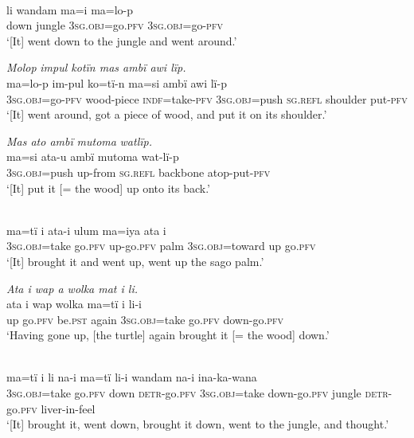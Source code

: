 \\
\gll li    wandam  ma{=i} ma=lo-p\\
down  jungle    3\textsc{sg.obj}=go.\textsc{pfv}  3\textsc{sg.obj}=go-\textsc{pfv}\\
\glt ‘[It] went down to the jungle and went around.’

\ex \textit{Molop} {\textit{impul kotïn mas ambï awi lïp.}}\\
\gll ma=lo-p      im-pul      ko=tï-n      ma=si      ambï awi      lï-p\\
3\textsc{sg.obj}=go-\textsc{pfv}  wood-piece  \textsc{indf}=take-\textsc{pfv}    \textsc{3sg.obj=}push  \textsc{sg.refl} shoulder  put-\textsc{pfv}\\
\glt ‘[It] went around, got a piece of wood, and put it on its shoulder.’

\ex \textit{Mas at}{\textit{o a}}\textit{mb}{\textit{ï}} \textit{m}{\textit{u}}\textit{t}{\textit{oma}} \textit{watlïp.}\\
\gll ma{=}si      at{a-u} {a}mb{ï} m{u}t{oma} wat{{}-}l{ï-}p\\
3\textsc{sg.obj}=push  up-from  \textsc{sg.refl}  backbone  atop-put-\textsc{pfv}\\
\glt ‘[It] put it [= the wood] up onto {its back.}’

\\
\gll ma{=}tï      i    ata-{i} ulum  ma=iya      ata  i\\
3\textsc{sg.obj}=take  go.\textsc{pfv}  up-go.\textsc{pfv}  palm  3\textsc{sg.obj=}toward  up  go.\textsc{pfv}\\
\glt ‘[It] brought it and went up, went up the sago palm.’

\ex \textit{Ata i w}{\textit{a}}\textit{p a wolka mat i li.}\\
\gll ata  i w{ap} wolka  ma{=}tï      i    li-i\\
up  go.\textsc{pfv}  be.\textsc{pst}  again  3\textsc{sg.obj}=take  go.\textsc{pfv}  down-go.\textsc{pfv}\\
\glt ‘Having gone up, [the turtle] again brought it [= the wood] down.’

\newpage

\\
\gll ma{=}tï      i    li    na{{}-i} ma{=}tï      li-i wandam  na{{}-i} ina-ka-wana\\
3\textsc{sg.obj}=take  go.\textsc{pfv}  down  \textsc{detr}{}-go.\textsc{pfv}  \textsc{3sg.obj=}take  down-go.\textsc{pfv} jungle    \textsc{detr-}go.\textsc{pfv}  liver-in-feel\\
\glt ‘[It] brought it, went down, brought it down, went to the jungle, and thought.’

